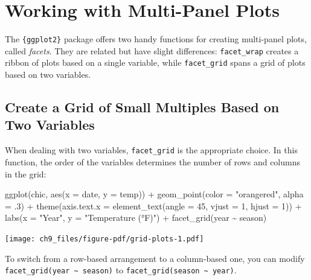 \documentclass[
  letterpaper,
]{scrbook}
\newenvironment{Shaded}{\begin{snugshade}}{\end{snugshade}}
\newcommand{\AttributeTok}[1]{\textcolor[rgb]{0.40,0.45,0.13}{#1}}
\newcommand{\DecValTok}[1]{\textcolor[rgb]{0.68,0.00,0.00}{#1}}
\newcommand{\FunctionTok}[1]{\textcolor[rgb]{0.28,0.35,0.67}{#1}}
\newcommand{\NormalTok}[1]{\textcolor[rgb]{0.00,0.23,0.31}{#1}}
\newcommand{\SpecialCharTok}[1]{\textcolor[rgb]{0.37,0.37,0.37}{#1}}
\newcommand{\StringTok}[1]{\textcolor[rgb]{0.13,0.47,0.30}{#1}}
\begin{document}

\chapter{Working with Multi-Panel Plots}\label{panels}

The \texttt{\{ggplot2\}} package offers two handy functions for creating
multi-panel plots, called \emph{facets}. They are related but have
slight differences: \texttt{facet\_wrap} creates a ribbon of plots based
on a single variable, while \texttt{facet\_grid} spans a grid of plots
based on two variables.

\section{Create a Grid of Small Multiples Based on Two
Variables}\label{create-a-grid-of-small-multiples-based-on-two-variables}

When dealing with two variables, \texttt{facet\_grid} is the appropriate
choice. In this function, the order of the variables determines the
number of rows and columns in the grid:

\begin{Shaded}
\begin{Highlighting}[]
\FunctionTok{ggplot}\NormalTok{(chic, }\FunctionTok{aes}\NormalTok{(}\AttributeTok{x =}\NormalTok{ date, }\AttributeTok{y =}\NormalTok{ temp)) }\SpecialCharTok{+}
  \FunctionTok{geom\_point}\NormalTok{(}\AttributeTok{color =} \StringTok{"orangered"}\NormalTok{, }\AttributeTok{alpha =}\NormalTok{ .}\DecValTok{3}\NormalTok{) }\SpecialCharTok{+}
  \FunctionTok{theme}\NormalTok{(}\AttributeTok{axis.text.x =} \FunctionTok{element\_text}\NormalTok{(}\AttributeTok{angle =} \DecValTok{45}\NormalTok{, }\AttributeTok{vjust =} \DecValTok{1}\NormalTok{, }\AttributeTok{hjust =} \DecValTok{1}\NormalTok{)) }\SpecialCharTok{+}
  \FunctionTok{labs}\NormalTok{(}\AttributeTok{x =} \StringTok{"Year"}\NormalTok{, }\AttributeTok{y =} \StringTok{"Temperature (°F)"}\NormalTok{) }\SpecialCharTok{+}
  \FunctionTok{facet\_grid}\NormalTok{(year }\SpecialCharTok{\textasciitilde{}}\NormalTok{ season)}
\end{Highlighting}
\end{Shaded}

\texttt{[image: ch9\_files/figure-pdf/grid-plots-1.pdf]}

To switch from a row-based arrangement to a column-based one, you can
modify \texttt{facet\_grid(year\ \textasciitilde{}\ season)} to
\texttt{facet\_grid(season\ \textasciitilde{}\ year)}.
\end{document}
